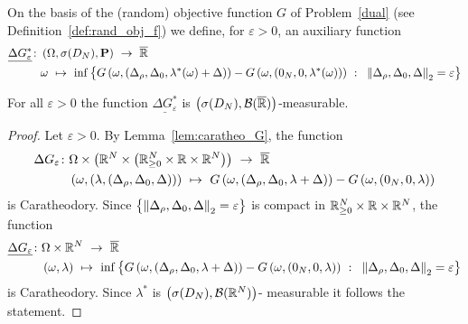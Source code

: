 On the basis of the (random) objective function $G$ of Problem~\ref{dual} (see Definition~\ref{def:rand_obj_f}) we define, for $\varepsilon>0$, an auxiliary function
   \begin{align*}
     \underline{
     \Delta G^*
     _\varepsilon
     }
     \colon
     &
     \left( \Omega,\sigma(D_N),\P \right)
     \ 
     \to
     \ 
     \overline{\R}
     \\
     &
     \omega
     \ 
     \mapsto
     \ 
   \inf
   \left\{ 
 G
   \left( 
     \omega,
     \left( 
\Delta_\rho,\Delta_0,\lambda^*(\omega)+\Delta
     \right)
   \right)
   -
   G
   \left(
     \omega,
     \left( 
0_N,0,\lambda^*(\omega)
     \right)
   \right)
   \ 
   \colon
   \ 
   \norm{
\Delta_\rho,\Delta_0,\Delta
   }_2
   =\varepsilon
   \right\}
   \end{align*}
\begin{lemma}
  \label{G_meas}
  For all $\varepsilon>0$ the function
  $
     \underline{
     \Delta G^*
     _\varepsilon
     }
  $
  is
  $
  \left( 
  \sigma(D_N),\mathcal{B}(\overline{\mathbb{R}})
  \right)
  $-measurable.
\end{lemma}
\begin{proof}
  Let $\varepsilon>0$.
  By Lemma~\ref{lem:caratheo_G}, the function
\begin{align*}
     \Delta G
     _\varepsilon
     \colon
     &
     \Omega
     \times
     \left( 
     \R^N
     \times
    \left( 
    \R^N_{\ge 0}\times\R\times\R^N
    \right)
     \right)
     \ 
     \to
     \ 
     \overline{\R}
     \\
     &
     \left( 
     \omega
     ,
     \left( 
     \lambda,
     \left( 
\Delta_\rho,\Delta_0,\Delta
     \right)
     \right)
     \right)
     \ 
     \mapsto
     \ 
 G
   \left( 
     \omega,
     \left( 
\Delta_\rho,\Delta_0,\lambda+\Delta
     \right)
   \right)
   -
   G
   \left(
     \omega,
     \left( 
0_N,0,\lambda
     \right)
   \right)
   \end{align*}
is Caratheodory.
Since
  $
  \left\{
   \left\lVert
\Delta_\rho,\Delta_0,\Delta
   \right\rVert_2
   =\varepsilon
  \right\}
  $
  is compact in 
  $
    \mathbb{R}^N_{\ge 0}\times\mathbb{R}\times\mathbb{R}^N
    $,
  the function
\begin{align*}
  \underline{
     \Delta G
     _\varepsilon
  }
     \colon
     &
     \Omega
     \times
     \R^N
     \ 
     \to
     \ 
     \overline{\R}
     \\
     &
     \left( 
     \omega
     ,
     \lambda
     \right)
     \ 
     \mapsto
     \ 
   \inf
    \left\{ 
 G
   \left( 
     \omega,
     \left( 
\Delta_\rho,\Delta_0,\lambda+\Delta
     \right)
   \right)
   -
   G
   \left(
     \omega,
     \left( 
0_N,0,\lambda
     \right)
   \right)
   \ 
   \colon
   \ 
   \norm{
\Delta_\rho,\Delta_0,\Delta
   }_2
   =\varepsilon
    \right\}
   \end{align*}
is Caratheodory.
Since 
$
\lambda^*
$
is 
$
\left( 
\sigma
(D_N)
,
\mathcal{B}(\mathbb{R}^N)
\right)
$-
measurable it follows the statement.
\end{proof}
